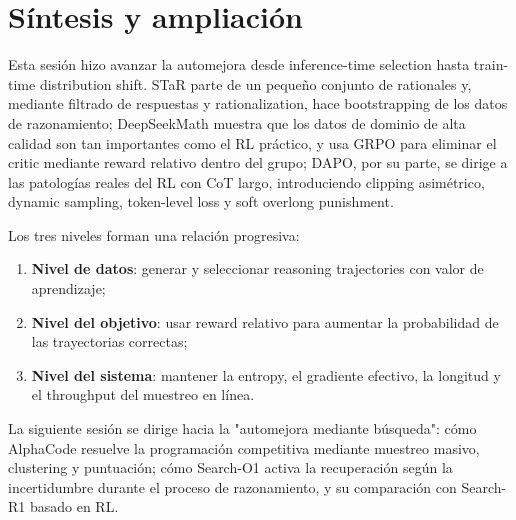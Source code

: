 \section{Síntesis y ampliación}

Esta sesión hizo avanzar la automejora desde inference-time selection hasta train-time distribution shift. STaR parte de un pequeño conjunto de rationales y, mediante filtrado de respuestas y rationalization, hace bootstrapping de los datos de razonamiento; DeepSeekMath muestra que los datos de dominio de alta calidad son tan importantes como el RL práctico, y usa GRPO para eliminar el critic mediante reward relativo dentro del grupo; DAPO, por su parte, se dirige a las patologías reales del RL con CoT largo, introduciendo clipping asimétrico, dynamic sampling, token-level loss y soft overlong punishment.

Los tres niveles forman una relación progresiva:

\begin{enumerate}
    \item \textbf{Nivel de datos}: generar y seleccionar reasoning trajectories con valor de aprendizaje;
    \item \textbf{Nivel del objetivo}: usar reward relativo para aumentar la probabilidad de las trayectorias correctas;
    \item \textbf{Nivel del sistema}: mantener la entropy, el gradiente efectivo, la longitud y el throughput del muestreo en línea.
\end{enumerate}

La siguiente sesión se dirige hacia la "automejora mediante búsqueda": cómo AlphaCode resuelve la programación competitiva mediante muestreo masivo, clustering y puntuación; cómo Search-O1 activa la recuperación según la incertidumbre durante el proceso de razonamiento, y su comparación con Search-R1 basado en RL.


